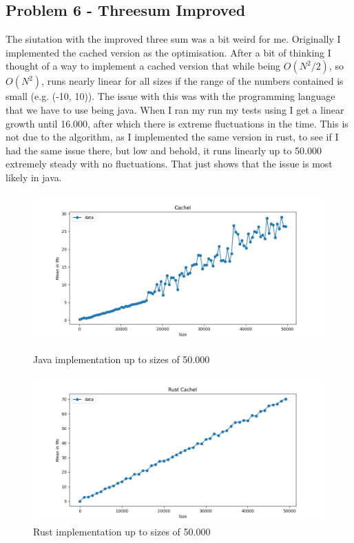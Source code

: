 \documentclass[12pt]{article}
\begin{document}
\hypertarget{p6}{\subsection{Problem 6 - Threesum Improved}}

The siutation with the improved three sum was a bit weird for me. Originally I implemented
the cached version as the optimisation. After a bit of thinking I thought of a way to implement
a cached version that while being $O({N^2}/2)$, so $O(N^2)$, runs nearly linear for all sizes if the range of the numbers contained is small (e.g. (-10, 10)).
The issue with this was with the programming language that we have to use being java. When I ran my run my tests using I get a linear growth until 16.000, after which
there is extreme fluctuations in the time. This is not due to the algorithm, as I implemented the same version
in rust, to see if I had the same issue there, but low and behold, it runs linearly up to 50.000 extremely steady
with no fluctuations. That just shows that the issue is most likely in java.

\begin{figure}[h]
    \centering
    \begin{minipage}{0.49\textwidth}
        \centering
        \includegraphics[width=0.9\linewidth]{images/cache_i_ms_50k_mean.png}
        \caption{Java implementation up to sizes of 50.000}
        \label{fig:image1}
    \end{minipage}\hfill
    \begin{minipage}{0.49\textwidth}
        \centering
        \includegraphics[width=0.9\linewidth]{images/cache_i_rs_mean.png}
        \caption{Rust implementation up to sizes of 50.000}
        \label{fig:image2}
    \end{minipage}
\end{figure}
\end{document}
